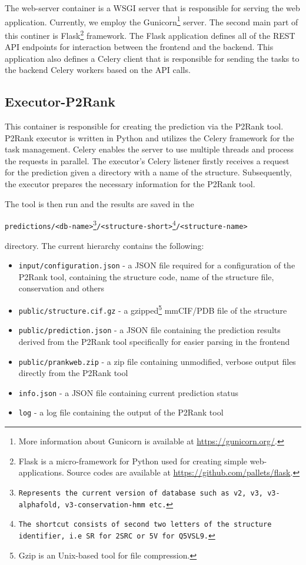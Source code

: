 The web-server container is a WSGI server that is responsible for serving the web application. Currently, we employ the Gunicorn\footnote{More information about Gunicorn is available at \url{https://gunicorn.org/}.} server. The second main part of this continer is Flask\footnote{Flask is a micro-framework for Python used for creating simple web-applications. Source codes are available at \url{https://github.com/pallets/flask}.} framework. The Flask application defines all of the REST API endpoints for interaction between the frontend and the backend. This application also defines a Celery client that is responsible for sending the tasks to the backend Celery workers based on the API calls.

\subsection{Executor-P2Rank}
\label{subsec:executor-p2rank}

This container is responsible for creating the prediction via the P2Rank tool. P2Rank executor is written in Python and utilizes the Celery framework for the task management. Celery enables the server to use multiple threads and process the requests in parallel. The executor's Celery listener firstly receives a request for the prediction given a directory with a name of the structure. Subsequently, the executor prepares the necessary information for the P2Rank tool.

The tool is then run and the results are saved in the

\texttt{predictions/<db-name>\footnote{Represents the current version of database such as v2, v3,  v3-alphafold, v3-conservation-hmm etc.}/<structure-short>\footnote{The shortcut consists of second two letters of the structure identifier, i.e \texttt{SR} for \texttt{2SRC} or \texttt{5V} for \texttt{Q5VSL9}.}/<structure-name>} 

directory. The current hierarchy contains the following:
\begin{itemize}
    \item \texttt{input/configuration.json} - a JSON file required for a configuration of the P2Rank tool, containing the structure code, name of the structure file, conservation and others
    \item \texttt{public/structure.cif.gz} - a gzipped\footnote{Gzip is an Unix-based tool for file compression.} mmCIF/PDB file of the structure
    \item \texttt{public/prediction.json} - a JSON file containing the prediction results derived from the P2Rank tool specifically for easier parsing in the frontend
    \item \texttt{public/prankweb.zip} - a zip file containing unmodified, verbose output files directly from the P2Rank tool
    \item \texttt{info.json} - a JSON file containing current prediction status
    \item \texttt{log} - a log file containing the output of the P2Rank tool
\end{itemize}

